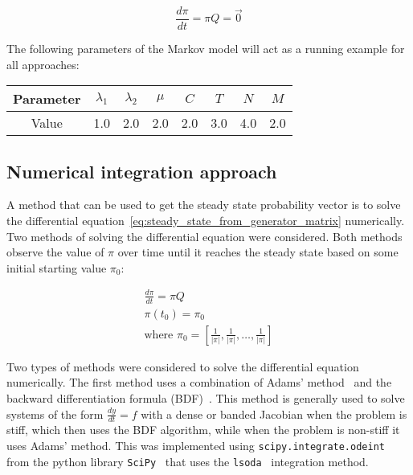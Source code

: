\begin{equation}\label{eq:steady_state_from_generator_matrix}
    \frac{d\pi}{dt} = \pi Q = \vec{0}
\end{equation}

The following parameters of the Markov model will act as a running example for
all approaches:

\begin{center}
    \begin{tabular}{|c|c|c|c|c|c|c|c|}
        \hline
        Parameter & \(\lambda_1\) & \(\lambda_2\) & \(\mu\) & \(C\) & \(T\)
        & \(N\) & \(M\) \\
        \hline
        Value & 1.0 & 2.0 & 2.0 & 2.0 & 3.0 & 4.0 & 2.0 \\
        \hline
    \end{tabular}
\end{center}


\subsection{Numerical integration approach}

A method that can be used to get the steady state probability vector is
to solve the differential equation~\eqref{eq:steady_state_from_generator_matrix}
numerically.
Two methods of solving the differential equation were considered.
Both methods observe the value of \(\pi\) over time until it
reaches the steady state based on some initial starting value \(\pi_0\):

\begin{gather}
    \frac{d\pi}{dt} = \pi Q \\
    \pi(t_0) = \pi_0 \nonumber \\
    \text{where } \pi_0 =
    [\frac{1}{|\pi|}, \frac{1}{|\pi|}, \dots, \frac{1}{|\pi|}] \nonumber
\end{gather}

Two types of methods were considered to solve the differential equation
numerically.
The first method uses a combination of Adams' method~\cite{adams_method} and the
backward differentiation formula (BDF)~\cite{backward_differentiation_formula}.
This method is generally used to solve systems of the form
\(\frac{dy}{dt} = f\) with a dense or banded Jacobian when the problem is stiff,
which then uses the BDF algorithm, while when the problem is non-stiff it uses
Adams' method.
This was implemented using \texttt{scipy.integrate.odeint} from the python
library \texttt{SciPy}~\cite{2020SciPy-NMeth} that uses the
\texttt{lsoda}~\cite{lsoda_algorithm} integration method.

